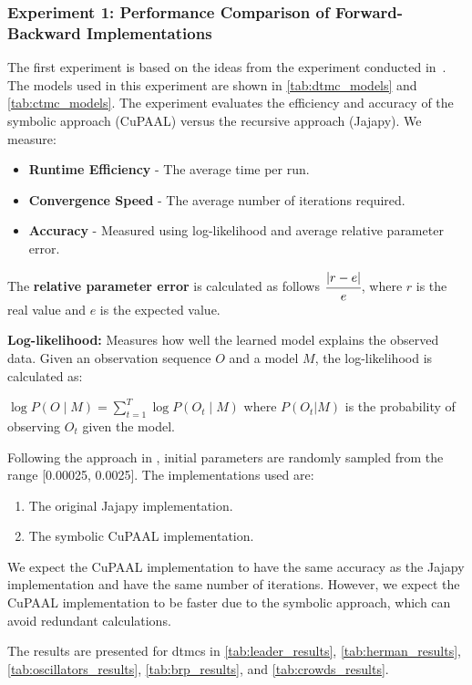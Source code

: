 \subsubsection{Experiment 1: Performance Comparison of Forward-Backward Implementations}
The first experiment is based on the ideas from the experiment conducted in~\cite{reynouard2024learning}.
The models used in this experiment are shown in \autoref{tab:dtmc_models} and \autoref{tab:ctmc_models}.
The experiment evaluates the efficiency and accuracy of the symbolic approach (CuPAAL) versus the recursive approach (Jajapy). We measure:
\begin{itemize}
    \item \textbf{Runtime Efficiency} - The average time per run.
    \item \textbf{Convergence Speed} - The average number of iterations required.
    \item \textbf{Accuracy} - Measured using log-likelihood and average relative parameter error.
\end{itemize}

The \textbf{relative parameter error} is calculated as follows $\cfrac{|r-e|}{e}$, where $r$ is the real value and $e$ is the expected value.

\textbf{Log-likelihood:} Measures how well the learned model explains the observed data. Given an observation sequence $O$ and a model $M$, the log-likelihood is calculated as:

$\log P(O \mid M) = \sum_{t=1}^{T} \log P(O_t \mid M)$ where $P(O_t|M)$ is the probability of observing $O_t$ given the model.

Following the approach in \cite{bacci2023mm}, initial parameters are randomly sampled from the range
    [0.00025, 0.0025]. The implementations used are:
\begin{enumerate}
    \item The original Jajapy implementation.
    \item The symbolic CuPAAL implementation.
\end{enumerate}

We expect the CuPAAL implementation to have the same accuracy as the Jajapy implementation and have the same number of iterations. However, we expect the CuPAAL implementation to be faster due to the symbolic approach, which can avoid redundant calculations.

The results are presented for \glspl{dtmc} in \autoref{tab:leader_results}, \autoref{tab:herman_results}, \autoref{tab:oscillators_results}, \autoref{tab:brp_results}, and \autoref{tab:crowds_results}.

